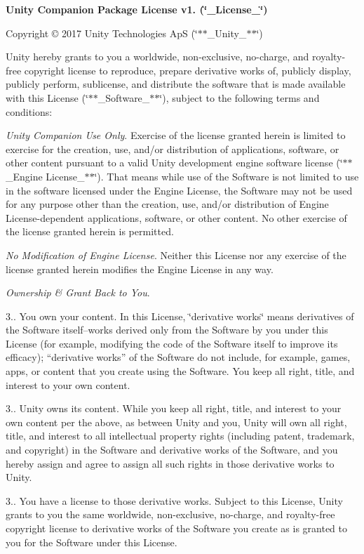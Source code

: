 {\bfseries{Unity Companion Package License v1. (\char`\"{}\+\_\+\+License\+\_\+\char`\"{})}}

Copyright © 2017 Unity Technologies ApS (\char`\"{}$\ast$$\ast$\+\_\+\+Unity\+\_\+$\ast$$\ast$\char`\"{})

Unity hereby grants to you a worldwide, non-\/exclusive, no-\/charge, and royalty-\/free copyright license to reproduce, prepare derivative works of, publicly display, publicly perform, sublicense, and distribute the software that is made available with this License (\char`\"{}$\ast$$\ast$\+\_\+\+Software\+\_\+$\ast$$\ast$\char`\"{}), subject to the following terms and conditions\+:


\begin{DoxyEnumerate}
\item {\itshape Unity Companion Use Only}. Exercise of the license granted herein is limited to exercise for the creation, use, and/or distribution of applications, software, or other content pursuant to a valid Unity development engine software license (\char`\"{}$\ast$$\ast$\+\_\+\+Engine License\+\_\+$\ast$$\ast$\char`\"{}). That means while use of the Software is not limited to use in the software licensed under the Engine License, the Software may not be used for any purpose other than the creation, use, and/or distribution of Engine License-\/dependent applications, software, or other content. No other exercise of the license granted herein is permitted.
\end{DoxyEnumerate}
\begin{DoxyEnumerate}
\item {\itshape No Modification of Engine License}. Neither this License nor any exercise of the license granted herein modifies the Engine License in any way.
\end{DoxyEnumerate}
\begin{DoxyEnumerate}
\item {\itshape Ownership \& Grant Back to You}.

3.. You own your content. In this License, \char`\"{}derivative works\char`\"{} means derivatives of the Software itself--works derived only from the Software by you under this License (for example, modifying the code of the Software itself to improve its efficacy); “derivative works” of the Software do not include, for example, games, apps, or content that you create using the Software. You keep all right, title, and interest to your own content.

3.. Unity owns its content. While you keep all right, title, and interest to your own content per the above, as between Unity and you, Unity will own all right, title, and interest to all intellectual property rights (including patent, trademark, and copyright) in the Software and derivative works of the Software, and you hereby assign and agree to assign all such rights in those derivative works to Unity.

3.. You have a license to those derivative works. Subject to this License, Unity grants to you the same worldwide, non-\/exclusive, no-\/charge, and royalty-\/free copyright license to derivative works of the Software you create as is granted to you for the Software under this License.
\end{DoxyEnumerate}
